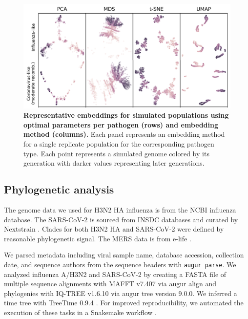 \documentclass[10pt,letterpaper]{article}
\begin{document}
\begin{figure}[!h]
\includegraphics[width=\columnwidth]{figures/simulated-populations-representative-embeddings.png}
\caption{{\bf Representative embeddings for simulated populations using optimal parameters per pathogen (rows) and embedding method (columns).}
  Each panel represents an embedding method for a single replicate population for the corresponding pathogen type.
  Each point represents a simulated genome colored by its generation with darker values representing later generations.}
\label{fig:simulated-populations-representative-embeddings}
\end{figure}

\subsection*{Phylogenetic analysis}

The genome data we used for H3N2 HA influenza is from the NCBI influenza database.
The SARS-CoV-2 is sourced from INSDC databases and curated by Nextstrain \cite{Hadfield2018}.
Clades for both H3N2 HA and SARS-CoV-2 were defined by reasonable phylogenetic signal.
The MERS data is from e-life \cite{dudas_carvalho_rambaut_bedford_2018}.

We parsed metadata including viral sample name, database accession, collection date, and sequence authors from the sequence headers with \texttt{augur parse}.
We analyzed influenza A/H3N2 and SARS-CoV-2 by creating a FASTA file of multiple sequence alignments with MAFFT v7.407 \cite{Katoh2002} via augur align \cite{Hadfield2018} and phylogenies with IQ-TREE v1.6.10 \cite{Nguyen2014} via augur tree version 9.0.0.
We inferred a time tree with TreeTime 0.9.4 \cite{Sagulenko2018}.
For improved reproducibility, we automated the execution of these tasks in a Snakemake workflow \cite{molder_2021}.
\end{document}
